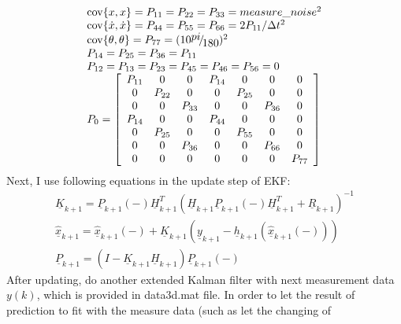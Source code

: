 \documentclass[10pt,letterpaper]{article}
\begin{document}
\begin{equation}
	\begin{array}{l}
	 {\mathop{\rm cov}} \{ x,x\}  = P_{11}  = P_{22}  = P_{33}  = measure\_noise^2  \\ 
	 {\mathop{\rm cov}} \{ \dot x,\dot x\}  = P_{44}  = P_{55}  = P_{66}  = 2P_{11} /\Delta t^2  \\ 
	 {\mathop{\rm cov}} \{ \theta ,\theta \}  = P_{77}  = (10{\raise0.7ex\hbox{${pi}$} \!\mathord{\left/
	 {\vphantom {{pi} {180}}}\right.\kern-\nulldelimiterspace}
	\!\lower0.7ex\hbox{${180}$}})^2  \\ 
	 P_{14}  = P_{25}  = P_{36}  = P_{11}  \\ 
	 P_{12}  = P_{13}  = P_{23}  = P_{45}  = P_{46}  = P_{56}  = 0 \\ 
	 P_0  = \left[ {\begin{array}{*{20}c}
	   {P_{11} } & 0 & 0 & {P_{14} } & 0 & 0 & 0  \\
	   0 & {P_{22} } & 0 & 0 & {P_{25} } & 0 & 0  \\
	   0 & 0 & {P_{33} } & 0 & 0 & {P_{36} } & 0  \\
	   {P_{14} } & 0 & 0 & {P_{44} } & 0 & 0 & 0  \\
	   0 & {P_{25} } & 0 & 0 & {P_{55} } & 0 & 0  \\
	   0 & 0 & {P_{36} } & 0 & 0 & {P_{66} } & 0  \\
	   0 & 0 & 0 & 0 & 0 & 0 & {P_{77} }  \\
	\end{array}} \right] \\ 
	 \end{array}
\end{equation}
Next, I use following equations in the update step of EKF:
\begin{eqnarray}
	\underline{K}_{k + 1}  = \underline{P}_{k + 1} ( - )\underline{H}_{k + 1}^T (\underline{H}_{k + 1} \underline{P}_{k+ 1} ( - )\underline{H}_{k + 1}^T  + \underline{R}_{k + 1} )^{ - 1} \\
	\underline{\hat{x}}_{k + 1}  = \underline{\hat{x}}_{k + 1} ( - ) + \underline{K}_{k + 1} (\underline{y}_{k + 1}  - \underline{h}_{k + 1} (\underline{\hat{x}}_{k + 1} ( - )))\\
	\underline{P}_{k + 1}  = (I - \underline{K}_{k + 1} \underline{H}_{k + 1} )\underline{P}_{k + 1} ( - )
\end{eqnarray}
After updating, do another extended Kalman filter with next measurement data $y(k)$, which is provided in 
data3d.mat file. In order to let the result of prediction to fit with the measure data (such as let the changing of 
\end{document}
